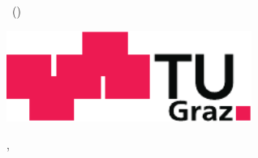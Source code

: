 

\thispagestyle{empty}  %
\large  %

\begin{center}
{\sc \myauthor\, (\myid)}

\vfill

{\sffamily\bfseries\Huge \mytitle}

\vspace*{2cm}

{\sc \mylecture}

\vfill

\includegraphics[width=8cm]{figures/TU_Graz_Logo}

\vfill

\mysubmissiontown, \mysubmissionmonth~\mysubmissionyear

\end{center}
\normalsize %
